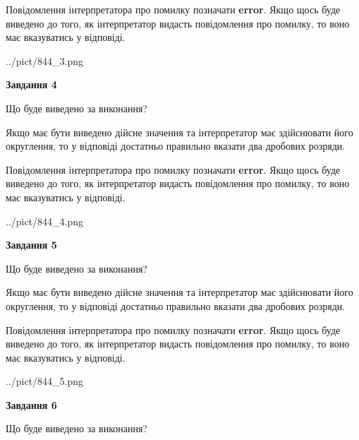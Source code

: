 \documentclass[12pt, ukrainian]{article}
\begin{document}
{\begin {Large}
Повідомлення інтерпретатора про помилку позначати \textbf{error}.
Якщо щось буде виведено до того, як інтерпретатор видасть повідомлення про помилку, 
то воно має вказуватись у відповіді. \par

\begin{center}
	{../pict/844_3.png}
\end{center}
\newpage

{\begin {center}\textbf{Завдання 4}\end {center}}\par
Що буде виведено за виконання? \par

Якщо має бути виведено дійсне значення та інтерпретатор має здійснювати його округлення, 
то у відповіді достатньо правильно вказати два дробових розряди.

Повідомлення інтерпретатора про помилку позначати \textbf{error}.
Якщо щось буде виведено до того, як інтерпретатор видасть повідомлення про помилку, 
то воно має вказуватись у відповіді. \par

\begin{center}
	{../pict/844_4.png}
\end{center}
\newpage

{\begin {center}\textbf{Завдання 5}\end {center}}\par
Що буде виведено за виконання? \par

Якщо має бути виведено дійсне значення та інтерпретатор має здійснювати його округлення, 
то у відповіді достатньо правильно вказати два дробових розряди.

Повідомлення інтерпретатора про помилку позначати \textbf{error}.
Якщо щось буде виведено до того, як інтерпретатор видасть повідомлення про помилку, 
то воно має вказуватись у відповіді. \par

\begin{center}
	{../pict/844_5.png}
\end{center}
\newpage

{\begin {center}\textbf{Завдання 6}\end {center}}\par
Що буде виведено за виконання? \par


\end{Large}}
\end{document}
